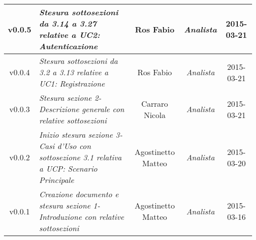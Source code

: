 \begin{table}[h]
	\centering
	\begin{tabular}{|c|p{}|c|c|c|}
		\toprule
		\midrule
		v0.0.5 & \textit{Stesura sottosezioni da 3.14 a 3.27 relative a UC2: Autenticazione} & Ros Fabio & \textit{Analista} & 2015-03-21\\
		\midrule
		v0.0.4 & \textit{Stesura sottosezioni da 3.2 a 3.13 relative a UC1: Registrazione} & Ros Fabio & \textit{Analista} & 2015-03-21\\
		\midrule
		v0.0.3 & \textit{Stesura sezione 2-Descrizione generale con relative sottosezioni} & Carraro Nicola & \textit{Analista} & 2015-03-21\\
		\midrule
		v0.0.2 & \textit{Inizio stesura sezione 3-Casi d'Uso con sottosezione 3.1 relativa a UCP: Scenario Principale} & Agostinetto Matteo & \textit{Analista} & 2015-03-20\\
		\midrule
		v0.0.1 & \textit{Creazione documento e stesura sezione 1-Introduzione con relative sottosezioni} & Agostinetto Matteo & \textit{Analista} & 2015-03-16\\
		\bottomrule
	\end{tabular}
\end{table}
\newpage